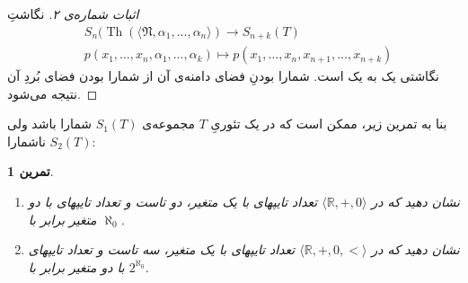 \documentclass[12pt,a4paper]{article}
\theoremstyle{colorhead}
\newtheorem{tam}[thm]{تمرین}
\DeclareMathOperator{\Th}{Th}
\begin{document}
\begin{proof}[اثبات شماره‌ی ۲]
نگاشتِ
\begin{align*}
&
S_n(\Th(\langle \mathfrak{N},\alpha_1,\ldots,\alpha_n\rangle)\to
S_{n+k}(T)\\
& p(x_1,\ldots,x_n,\alpha_1,\ldots,\alpha_k)\mapsto p(x_1,\ldots,x_n,x_{n+1},\ldots,x_{n+k})
\end{align*}
نگاشتی یک به یک است. شمارا بودنِ
فضای دامنه‌ی آن از شمارا بودن فضای بُردِ آن نتیجه می‌شود.
\end{proof}
بنا به تمرین زیر، ممکن است که در یک تئوریِ
$T$
مجموعه‌ی
$S_1(T)$
شمارا باشد ولی
$S_2(T)$
ناشمارا:
\begin{tam}
\hfill
\begin{enumerate}
\item 
نشان دهید که در
$\langle \mathbb{R},+,0\rangle$
تعداد تایپهای با یک متغیر، دو تاست و تعداد تایپهای با دو متغیر برابر با
$\aleph_0$.
\item 
نشان دهید که در
$\langle \mathbb{R},+,0,<\rangle$
تعداد تایپهای با یک متغیر، سه تاست و تعداد تایپهای با دو متغیر برابر با
$2^{\aleph_0}$.

\end{enumerate}

\end{tam}
\end{document}

